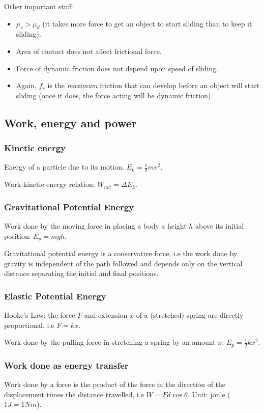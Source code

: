 Other important stuff:
\begin{itemize}
    \item $\mu_s > \mu_d$ (it takes more force to get an object to start
        sliding than to keep it sliding).
    \item Area of contact does not affect frictional force.
    \item Force of dynamic friction does not depend upon speed of sliding.
    \item Again, $f_s$ is the \textit{maximum} friction that can develop before
        an object will start sliding (once it does, the force acting will be
        dynamic friction).
\end{itemize}

\subsection{Work, energy and power}

\subsubsection{Kinetic energy}
Energy of a particle due to its motion. $E_k = \frac{1}{2}mv^2$.

Work-kinetic energy relation: $W_{net} = \Delta E_k$.

\subsubsection{Gravitational Potential Energy}
Work done by the moving force in placing a body a height $h$ above its initial
position: $E_p = mgh$.

Gravitational potential energy is a conservative force, i.e the work done by
gravity is independent of the path followed and depends only on the vertical
distance separating the initial and final positions.

\subsubsection{Elastic Potential Energy}
Hooke's Law: the force $F$ and extension $x$ of a (stretched) spring are
directly proportional, i.e $F = kx$.

Work done by the pulling force in stretching a spring by an amount $x$:
$E_p = \frac{1}{2}kx^2$.

\subsubsection{Work done as energy transfer}
Work done by a force is the product of the force in the direction of the
displacement times the distance travelled, i.e $W = Fd\cos\theta$. Unit: joule
($1 J = 1 Nm$).

